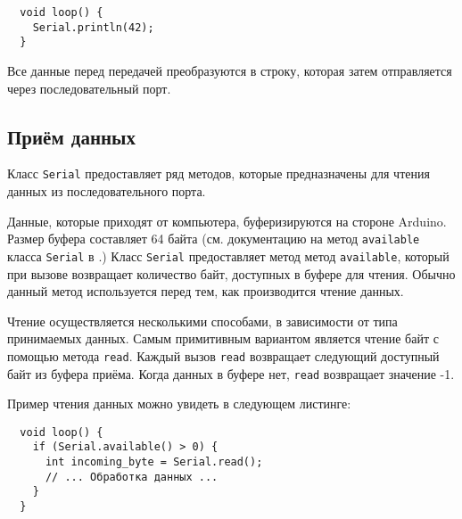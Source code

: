 \documentclass[../sparc.tex]{subfiles}
\begin{document}
\begin{verbatim}
  void loop() {
    Serial.println(42);
  }
\end{verbatim}

Все данные перед передачей преобразуются в строку, которая затем отправляется
через последовательный порт.

\subsection{Приём данных}

Класс \texttt{Serial} предоставляет ряд методов, которые предназначены для
чтения данных из последовательного порта.

Данные, которые приходят от компьютера, буферизируются на стороне Ardu\-ino.
Размер буфера составляет 64 байта (см. документацию на метод \texttt{available}
класса \texttt{Serial} в \cite{arduino:reference}.)  Класс \texttt{Serial}
предоставляет метод метод \texttt{available}, который при вызове возвращает
количество байт, доступных в буфере для чтения.  Обычно данный метод
используется перед тем, как производится чтение данных.

Чтение осуществляется несколькими способами, в зависимости от типа принимаемых
данных.  Самым примитивным вариантом является чтение байт с помощью метода
\texttt{read}.  Каждый вызов \texttt{read} возвращает следующий доступный байт
из буфера приёма.  Когда данных в буфере нет, \texttt{read} возвращает значение
-1.


Пример чтения данных можно увидеть в следующем листинге:

\begin{verbatim}
  void loop() {
    if (Serial.available() > 0) {
      int incoming_byte = Serial.read();
      // ... Обработка данных ...
    }
  }
\end{verbatim}
\end{document}
